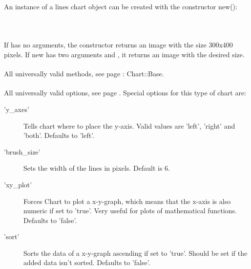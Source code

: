  An instance of a lines chart object can be created with the constructor new():\\
\\
\\
\\
If  has no arguments, the constructor returns an image with the size 300x400 pixels. If new has two arguments  and , it returns an image with the desired size. \\ 
\\ 
All universally valid methods, see page \pageref{methods}: Chart::Base. \\
\\
 All universally valid options, see page \pageref{options}. Special options for this type of chart are:\\
\begin{description}
\item['y\_axes'] Tells chart where to place the y-axis. Valid values are 'left', 'right' and 'both'. Defaults to 'left'.
\item['brush\_size']Sets the width of the lines in pixels. Default is 6.
\item['xy\_plot']Forces Chart to plot a x-y-graph, which means that the x-axis is also numeric if set to 'true'. Very useful for plots of mathematical functions. Defaults to 'false'.
\item['sort']Sorts the data of a x-y-graph ascending if set to 'true'. Should be set if the added data isn't sorted. Defaults to 'false'.   
\end{description}